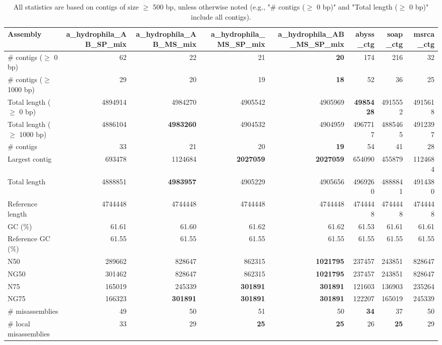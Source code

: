 \documentclass[12pt,a4paper]{article}
\begin{document}
\begin{table}[ht]
\begin{center}
\caption{All statistics are based on contigs of size $\geq$ 500 bp, unless otherwise noted (e.g., "\# contigs ($\geq$ 0 bp)" and "Total length ($\geq$ 0 bp)" include all contigs).}
\begin{tabular}{|l*{7}{|r}|}
\hline
Assembly & a\_hydrophila\_AB\_SP\_mix & a\_hydrophila\_AB\_MS\_mix & a\_hydrophila\_MS\_SP\_mix & a\_hydrophila\_AB\_MS\_SP\_mix & abyss\_ctg & soap\_ctg & msrca\_ctg \\ \hline
\# contigs ($\geq$ 0 bp) & 62 & 22 & 21 & {\bf 20} & 174 & 216 & 32 \\ \hline
\# contigs ($\geq$ 1000 bp) & 29 & 20 & 19 & {\bf 18} & 52 & 36 & 25 \\ \hline
Total length ($\geq$ 0 bp) & 4894914 & 4984270 & 4905542 & 4905969 & {\bf 4985428} & 4915552 & 4915618 \\ \hline
Total length ($\geq$ 1000 bp) & 4886104 & {\bf 4983260} & 4904532 & 4904959 & 4967717 & 4885465 & 4912397 \\ \hline
\# contigs & 33 & 21 & 20 & {\bf 19} & 54 & 41 & 28 \\ \hline
Largest contig & 693478 & 1124684 & {\bf 2027059} & {\bf 2027059} & 654090 & 455879 & 1124684 \\ \hline
Total length & 4888851 & {\bf 4983957} & 4905229 & 4905656 & 4969260 & 4888841 & 4914380 \\ \hline
Reference length & 4744448 & 4744448 & 4744448 & 4744448 & 4744448 & 4744448 & 4744448 \\ \hline
GC (\%) & 61.61 & 61.60 & 61.62 & 61.62 & 61.53 & 61.61 & 61.61 \\ \hline
Reference GC (\%) & 61.55 & 61.55 & 61.55 & 61.55 & 61.55 & 61.55 & 61.55 \\ \hline
N50 & 289662 & 828647 & 862315 & {\bf 1021795} & 237457 & 243851 & 828647 \\ \hline
NG50 & 301462 & 828647 & 862315 & {\bf 1021795} & 237457 & 243851 & 828647 \\ \hline
N75 & 165019 & 245339 & {\bf 301891} & {\bf 301891} & 121603 & 136903 & 235264 \\ \hline
NG75 & 166323 & {\bf 301891} & {\bf 301891} & {\bf 301891} & 122207 & 165019 & 245339 \\ \hline
\# misassemblies & 49 & 50 & 51 & 50 & {\bf 34} & 37 & 50 \\ \hline
\# local misassemblies & 33 & 29 & {\bf 25} & {\bf 25} & 26 & {\bf 25} & 29 \\ \hline

\end{tabular}
\end{center}
\end{table}
\end{document}
